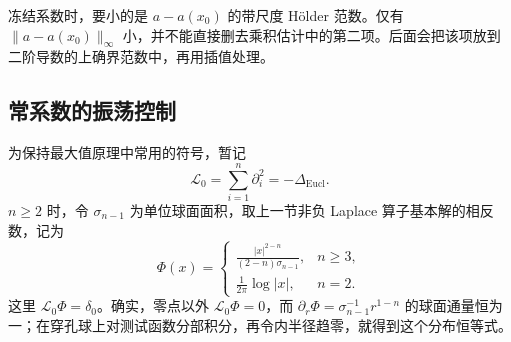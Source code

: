冻结系数时，要小的是 \(a-a(x_0)\) 的带尺度 Hölder 范数。仅有 \(\|a-a(x_0)\|_\infty\) 小，并不能直接删去乘积估计中的第二项。后面会把该项放到二阶导数的上确界范数中，再用插值处理。

\subsection{常系数的振荡控制}
\label{g3:subsec:1205:02}
为保持最大值原理中常用的符号，暂记
\[
	\mathcal L_0=\sum_{i=1}^n\partial_i^2=-\Delta_{\mathrm{Eucl}}.
\]
\(n\ge2\) 时，令 \(\sigma_{n-1}\) 为单位球面面积，取上一节非负 Laplace 算子基本解的相反数，记为
\[
	\Phi(x)=
	\begin{cases}
		\displaystyle\frac{|x|^{2-n}}{(2-n)\sigma_{n-1}},&n\ge3,\\[4pt]
		\displaystyle\frac1{2\pi}\log|x|,&n=2.
	\end{cases}
\]
这里 \(\mathcal L_0\Phi=\delta_0\)。确实，零点以外 \(\mathcal L_0\Phi=0\)，而 \(\partial_r\Phi=\sigma_{n-1}^{-1}r^{1-n}\) 的球面通量恒为一；在穿孔球上对测试函数分部积分，再令内半径趋零，就得到这个分布恒等式。

